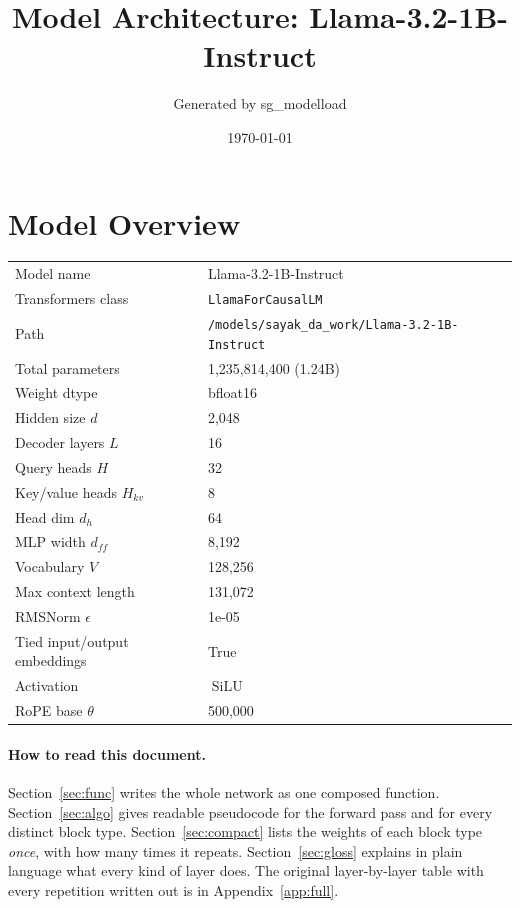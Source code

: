 \documentclass[10pt,a4paper]{article}
\title{Model Architecture: Llama-3.2-1B-Instruct}
\author{Generated by sg\_modelload}
\date{\today}
\newcommand{\op}[1]{\operatorname{#1}}
\begin{document}
\maketitle
\tableofcontents
\clearpage
\section{Model Overview}
\begin{tabular}{ll}
\toprule
Model name & Llama-3.2-1B-Instruct \\
Transformers class & \texttt{LlamaForCausalLM} \\
Path & \texttt{/models/sayak\_da\_work/Llama-3.\allowbreak{}2-1B-Instruct} \\
Total parameters & 1,235,814,400 (1.24B) \\
Weight dtype & bfloat16 \\
\midrule
Hidden size $d$ & 2,048 \\
Decoder layers $L$ & 16 \\
Query heads $H$ & 32 \\
Key/value heads $H_{kv}$ & 8 \\
Head dim $d_h$ & 64 \\
MLP width $d_{ff}$ & 8,192 \\
Vocabulary $V$ & 128,256 \\
Max context length & 131,072 \\
RMSNorm $\epsilon$ & 1e-05 \\
Tied input/output embeddings & True \\
Activation & $\op{SiLU}$ \\
RoPE base $\theta$ & 500,000 \\
\bottomrule
\end{tabular}

\paragraph{How to read this document.} Section~\ref{sec:func} writes the whole network as one composed function. Section~\ref{sec:algo} gives readable pseudocode for the forward pass and for every distinct block type. Section~\ref{sec:compact} lists the weights of each block type \emph{once}, with how many times it repeats. Section~\ref{sec:gloss} explains in plain language what every kind of layer does. The original layer-by-layer table with every repetition written out is in Appendix~\ref{app:full}.
\end{document}
